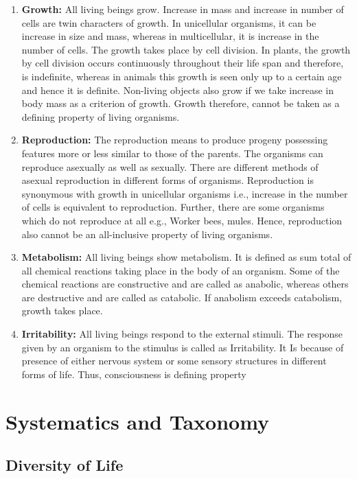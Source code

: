 \documentclass[
]{book}
\begin{document}
\begin{enumerate}
\def\labelenumi{\arabic{enumi}.}
\item
  \textbf{Growth:} All living beings grow. Increase in mass and increase in number of cells are twin characters of growth. In unicellular organisms, it can be increase in size and mass, whereas in multicellular, it is increase in the number of cells. The growth takes place by cell division. In plants, the growth by cell division occurs continuously throughout their life span and therefore, is indefinite, whereas in animals this growth is seen only up to a certain age and hence it is definite. Non-living objects also grow if we take increase in body mass as a criterion of growth. Growth therefore, cannot be taken as a defining property of living organisms.
\item
  \textbf{Reproduction:} The reproduction means to produce progeny possessing features more or less similar to those of the parents. The organisms can reproduce asexually as well as sexually. There are different methods of asexual reproduction in different forms of organisms. Reproduction is synonymous with growth in unicellular organisms i.e., increase in the number of cells is equivalent to reproduction. Further, there are some organisms which do not reproduce at all e.g., Worker bees, mules. Hence, reproduction also cannot be an all-inclusive property of living organisms.
\item
  \textbf{Metabolism:} All living beings show metabolism. It is defined as sum total of all chemical reactions taking place in the body of an organism. Some of the chemical reactions are constructive and are called as anabolic, whereas others are destructive and are called as catabolic. If anabolism exceeds catabolism, growth takes place.
\item
  \textbf{Irritability:} All living beings respond to the external stimuli. The response given by an organism to the stimulus is called as Irritability. It Is because of presence of either nervous system or some sensory structures in different forms of life. Thus, consciousness is defining property
\end{enumerate}

\hypertarget{systematics-and-taxonomy}{%
\section{Systematics and Taxonomy}\label{systematics-and-taxonomy}}

\hypertarget{diversity-of-life}{%
\subsection{Diversity of Life}\label{diversity-of-life}}
\end{document}
